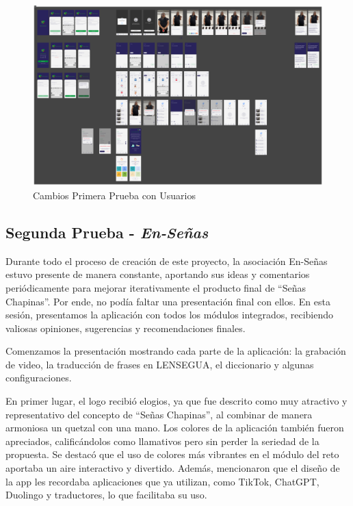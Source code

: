 \begin{figure} [H]
    \centering
    \includegraphics[width=1\linewidth]{figuras/prototipo_cambios1.png}
    \caption{Cambios Primera Prueba con Usuarios}
    \label{fig:enter-label}
\end{figure}


\subsection{Segunda Prueba - \textit{En-Señas}}


Durante todo el proceso de creación de este proyecto, la asociación En-Señas estuvo presente de manera constante, aportando sus ideas y comentarios periódicamente para mejorar iterativamente el producto final de ``Señas Chapinas''. Por ende, no podía faltar una presentación final con ellos. En esta sesión, presentamos la aplicación con todos los módulos integrados, recibiendo valiosas opiniones, sugerencias y recomendaciones finales.

Comenzamos la presentación mostrando cada parte de la aplicación: la grabación de video, la traducción de frases en LENSEGUA, el diccionario y algunas configuraciones. 

En primer lugar, el logo recibió elogios, ya que fue descrito como muy atractivo y representativo del concepto de ``Señas Chapinas'', al combinar de manera armoniosa un quetzal con una mano. Los colores de la aplicación también fueron apreciados, calificándolos como llamativos pero sin perder la seriedad de la propuesta. Se destacó que el uso de colores más vibrantes en el módulo del reto aportaba un aire interactivo y divertido. Además, mencionaron que el diseño de la app les recordaba aplicaciones que ya utilizan, como TikTok, ChatGPT, Duolingo y traductores, lo que facilitaba su uso.


